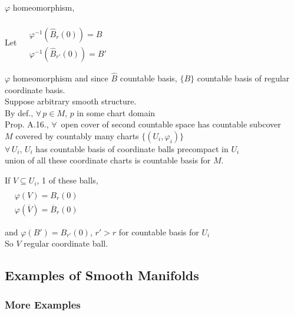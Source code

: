 \documentclass[11pt]{amsart}
\theoremstyle{definition}
\begin{document}
$\varphi$ homeomorphism,

\quad Let $\begin{aligned}
  & \quad \\
  & \varphi^{-1}( \widehat{B}_r{(0)}) = B \\
  & \varphi^{-1}{(\widehat{B}_{r'}{(0)} )} = B' \end{aligned}$

$\varphi$ homeomorphism and since $\widehat{B}$ countable basis, $\lbrace B \rbrace$ countable basis of regular coordinate basis. \\

Suppose arbitrary smooth structure.  \\
\quad By def., $\forall \, p \in M$, $p$ in some chart domain \\
\quad Prop. A.16., $\forall \, $ open cover of second countable space has countable subcover \\
\quad $M$ covered by countably many charts $\lbrace (U_i, \varphi_i) \rbrace$ \\

$\forall \, U_i , \, U_i$ has countable basis of coordinate balls precompact in $U_i$ \\
union of all these coordinate charts is countable basis for $M$.

If $V \subseteq U_i$, 1 of these balls,  \\
$\begin{aligned}
  & \quad \\
  & \varphi(V) = B_r(0) \\
  & \varphi{(\overline{V})} = \overline{B}_r(0)
\end{aligned}$

and $\varphi(B') = B_{r'}{(0)}$, $r' > r$ for countable basis for $U_i$ \\
So $V$ regular coordinate ball.


\hrulefill



\subsection*{Examples of Smooth Manifolds}






\subsubsection*{More Examples}
\end{document}
